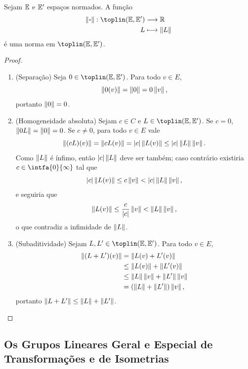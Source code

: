 \begin{prop}
Sejam $\E$ e $\E'$ espaços normados. A função
	\begin{align*}
	\func{\nor{\var}}{\toplin(\E,\E')}{\R}{L}{\nor{L}}
	\end{align*}
é uma norma em $\toplin(\E,\E')$.
\end{prop}
\begin{proof}
	\begin{enumerate}
	\item (Separação) Seja $0 \in \toplin(\E,\E')$. Para todo $v \in E$,
	\begin{equation*}
	\nor{0(v)} = \nor{0}=0\nor{v},
	\end{equation*}
portanto $\nor{0}=0$.
	
	\item (Homogeneidade absoluta) Sejam $c \in C$ e $L \in \toplin(\E,\E')$. Se $c=0$, $\nor{0L}=\nor{0}=0$. Se $c \neq 0$, para todo $v \in E$ vale
	\begin{equation*}
	\nor{(cL)(v)} = \nor{cL(v)} = \abs{c}\nor{L(v)} \leq \abs{c}\nor{L}\nor{v}.
	\end{equation*}
Como $\nor{L}$ é ínfimo, então $\abs{c}\nor{L}$ deve ser também; caso contrário existiria $c \in \intfa{0}{\infty}$ tal que
	\begin{equation*}
	\abs{c}\nor{L(v)} \leq c\nor{v} < \abs{c}\nor{L}\nor{v},
	\end{equation*}
e seguiria que
	\begin{equation*}
	\nor{L(v)} \leq \frac{c}{\abs{c}}\nor{v} < \nor{L}\nor{v},
	\end{equation*}
o que contradiz a infimidade de $\nor{L}$.
	
	\item (Subaditividade) Sejam $L,L' \in \toplin(\E,\E')$. Para todo $v \in E$,
	\begin{align*}
	\nor{(L+L')(v)} &= \nor{L(v)+L'(v)} \\
		&\leq \nor{L(v)} + \nor{L'(v)} \\
		&\leq \nor{L}\nor{v} + \nor{L'}\nor{v} \\
		&= (\nor{L}+\nor{L'})\nor{v},
	\end{align*}
portanto $\nor{L+L'} \leq \nor{L}+\nor{L'}$. \qedhere
	\end{enumerate}
\end{proof}

\subsection{Os Grupos Lineares Geral e Especial de Transformações e de Isometrias}

